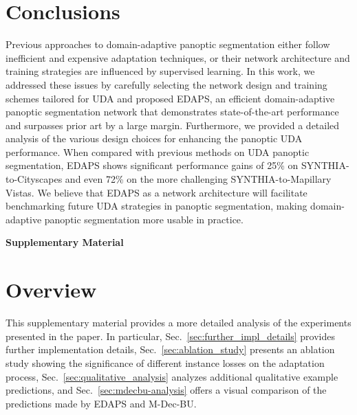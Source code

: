 \documentclass[10pt,twocolumn,letterpaper]{article}
\begin{document}
 \section{Conclusions}

Previous approaches to domain-adaptive panoptic segmentation either follow inefficient and expensive adaptation techniques, or their network architecture and training strategies are influenced by supervised learning.
In this work, we addressed these issues by carefully selecting the network design and training schemes tailored for UDA and proposed EDAPS, an efficient domain-adaptive panoptic segmentation network that demonstrates state-of-the-art performance and surpasses prior art by a large margin. 
Furthermore, we provided a detailed analysis of the various design choices for enhancing the panoptic UDA performance.
When compared with previous methods on UDA panoptic segmentation, EDAPS shows significant performance gains of 25\% on SYNTHIA-to-Cityscapes and even 72\% on the more challenging SYNTHIA-to-Mapillary Vistas.
We believe that EDAPS as a network architecture will facilitate benchmarking future UDA strategies in panoptic segmentation, making domain-adaptive panoptic segmentation more usable in practice.



 
\clearpage

{\small


}

\clearpage

\noindent\textbf{\Large Supplementary Material}

\makeatletter
\renewcommand{\theHsection}{papersection.\number\value{section}} \renewcommand{\thesection}{\Alph{section}}
\renewcommand{\thefigure}{S\arabic{figure}}
\renewcommand{\thetable}{S\arabic{table}}
\setcounter{section}{0}

\setcounter{figure}{0}
\setcounter{table}{0}
\makeatother

\section{Overview}
This supplementary material provides a more detailed analysis of the experiments presented in the paper.
In particular,
Sec.~\ref{sec:further_impl_details} provides further implementation details,
Sec.~\ref{sec:ablation_study} presents an ablation study showing the significance of different instance losses on the adaptation process,
Sec.~\ref{sec:qualitative_analysis} analyzes additional qualitative example predictions,
and Sec.~\ref{sec:mdecbu-analysis} offers a visual comparison of the predictions made by EDAPS and M-Dec-BU.
\end{document}
